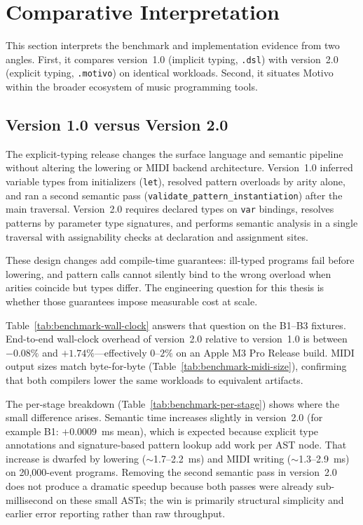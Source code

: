 \section{Comparative Interpretation}\label{sec:comparative-interpretation}

This section interprets the benchmark and implementation evidence from two angles.
First, it compares version~1.0 (implicit typing, \texttt{.dsl}) with version~2.0 (explicit typing, \texttt{.motivo}) on
identical workloads.
Second, it situates Motivo within the broader ecosystem of music programming tools.

\subsection{Version 1.0 versus Version 2.0}\label{detail-subsec:version-comparison}

The explicit-typing release changes the surface language and semantic pipeline without altering the lowering or MIDI
backend architecture.
Version~1.0 inferred variable types from initializers (\texttt{let}), resolved pattern overloads by arity alone, and ran
a second semantic pass (\texttt{validate\_pattern\_instantiation}) after the main traversal.
Version~2.0 requires declared types on \texttt{var} bindings, resolves patterns by parameter type signatures, and
performs semantic analysis in a single traversal with assignability checks at declaration and assignment sites.

These design changes add compile-time guarantees: ill-typed programs fail before lowering, and pattern calls cannot
silently bind to the wrong overload when arities coincide but types differ.
The engineering question for this thesis is whether those guarantees impose measurable cost at scale.

Table~\ref{tab:benchmark-wall-clock} answers that question on the B1--B3 fixtures.
End-to-end wall-clock overhead of version~2.0 relative to version~1.0 is between $-0.08\%$ and $+1.74\%$---effectively
$0$--$2\%$ on an Apple M3 Pro Release build.
MIDI output sizes match byte-for-byte (Table~\ref{tab:benchmark-midi-size}), confirming that both compilers lower the
same workloads to equivalent artifacts.

The per-stage breakdown (Table~\ref{tab:benchmark-per-stage}) shows where the small difference arises.
Semantic time increases slightly in version~2.0 (for example B1: $+0.0009$~ms mean), which is expected because explicit
type annotations and signature-based pattern lookup add work per AST node.
That increase is dwarfed by lowering ($\sim$1.7--2.2~ms) and MIDI writing ($\sim$1.3--2.9~ms) on 20,000-event
programs.
Removing the second semantic pass in version~2.0 does not produce a dramatic speedup because both passes were already
sub-millisecond on these small ASTs; the win is primarily structural simplicity and earlier error reporting rather than
raw throughput.

